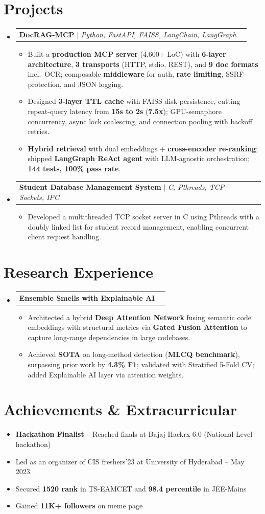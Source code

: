 \documentclass[letterpaper,10.8pt]{article}
\makeatletter
\newcommand{\resumeItem}[1]{
  \item\small{#1 \vspace{-1pt}}
}
\newcommand{\resumeProjectHeading}[2]{
    \item
    \begin{tabular*}{\textwidth}{l@{\extracolsep{\fill}}r}
      \small#1 & \textbf{\small #2}\\
    \end{tabular*}\vspace{-7pt}
}
\newcommand{\resumeSubHeadingListStart}{\begin{itemize}[leftmargin=0.0in, label={}]}
\newcommand{\resumeSubHeadingListEnd}{\end{itemize}\vspace{-5pt}}
\newcommand{\resumeItemListStart}{\begin{itemize}[itemsep=1pt, topsep=0pt, leftmargin=0.15in]}
\newcommand{\resumeItemListEnd}{\end{itemize}\vspace{-5pt}}
\makeatother
\begin{document}
\section{Projects}
\resumeSubHeadingListStart

\resumeProjectHeading
  {\textbf{\color{accent}DocRAG-MCP} $|$ \emph{Python, FastAPI, FAISS, LangChain, LangGraph}} {}
\resumeItemListStart
  \resumeItem{Built a \textbf{production MCP server} (4,600+ LoC) with \textbf{6-layer architecture}, \textbf{3 transports} (HTTP, stdio, REST), and \textbf{9 doc formats} incl.\ OCR; composable \textbf{middleware} for auth, \textbf{rate limiting}, SSRF protection, and JSON logging.}
  \resumeItem{Designed \textbf{3-layer TTL cache} with FAISS disk persistence, cutting repeat-query latency from \textbf{15s to 2s} (\textbf{7.5x}); GPU-semaphore concurrency, async lock coalescing, and connection pooling with backoff retries.}
  \resumeItem{\textbf{Hybrid retrieval} with dual embeddings + \textbf{cross-encoder re-ranking}; shipped \textbf{LangGraph ReAct agent} with LLM-agnostic orchestration; \textbf{144 tests, 100\% pass rate}.}
\resumeItemListEnd

\resumeProjectHeading
  {\textbf{\color{accent}Student Database Management System} $|$ \emph{C, Pthreads, TCP Sockets, IPC}} {}
\resumeItemListStart
  \resumeItem{Developed a multithreaded TCP socket server in C using Pthreads with a doubly linked list for student record management, enabling concurrent client request handling.}
\resumeItemListEnd

\resumeSubHeadingListEnd

\section{Research Experience}
\resumeSubHeadingListStart

\resumeProjectHeading
  {\textbf{\color{accent}Ensemble Smells with Explainable AI}} {}
\resumeItemListStart
  \resumeItem{Architected a hybrid \textbf{Deep Attention Network} fusing semantic code embeddings with structural metrics via \textbf{Gated Fusion Attention} to capture long-range dependencies in large codebases.}
  \resumeItem{Achieved \textbf{SOTA} on long-method detection (\textbf{MLCQ benchmark}), surpassing prior work by \textbf{4.3\% F1}; validated with Stratified 5-Fold CV; added Explainable AI layer via attention weights.}
\resumeItemListEnd

\resumeSubHeadingListEnd

\section{Achievements \& Extracurricular}
\resumeItemListStart
  \resumeItem{\textbf{Hackathon Finalist} -- Reached finals at Bajaj Hackrx 6.0 (National-Level hackathon)}
  \resumeItem{Led as an organizer of CIS freshers'23 at University of Hyderabad -- May 2023}
  \resumeItem{Secured \textbf{1520 rank} in TS-EAMCET and \textbf{98.4 percentile} in JEE-Mains}
  \resumeItem{Gained \textbf{11K+ followers} on meme page}
\resumeItemListEnd
\end{document}

